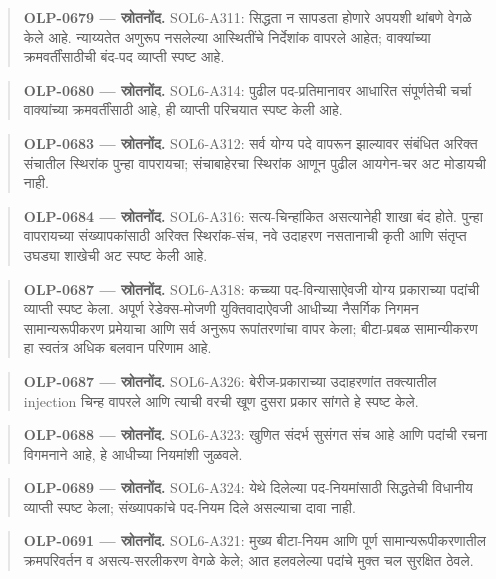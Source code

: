 \begin{quote}\small\textbf{OLP-0679 — स्रोतनोंद.} SOL6-A311: सिद्धता न सापडता होणारे अपयशी थांबणे वेगळे केले आहे. न्याय्यतेत अणुरूप नसलेल्या आस्थितींचे निर्देशांक वापरले आहेत; वाक्यांच्या क्रमवर्तींसाठीची बंद-पद व्याप्ती स्पष्ट आहे.\end{quote}
\begin{quote}\small\textbf{OLP-0680 — स्रोतनोंद.} SOL6-A314: पुढील पद-प्रतिमानावर आधारित संपूर्णतेची चर्चा वाक्यांच्या क्रमवर्तींसाठी आहे, ही व्याप्ती परिचयात स्पष्ट केली आहे.\end{quote}
\begin{quote}\small\textbf{OLP-0683 — स्रोतनोंद.} SOL6-A312: सर्व योग्य पदे वापरून झाल्यावर संबंधित अरिक्त संचातील स्थिरांक पुन्हा वापरायचा; संचाबाहेरचा स्थिरांक आणून पुढील आयगेन-चर अट मोडायची नाही.\end{quote}
\begin{quote}\small\textbf{OLP-0684 — स्रोतनोंद.} SOL6-A316: सत्य-चिन्हांकित असत्यानेही शाखा बंद होते. पुन्हा वापरायच्या संख्यापकांसाठी अरिक्त स्थिरांक-संच, नवे उदाहरण नसतानाची कृती आणि संतृप्त उघड्या शाखेची अट स्पष्ट केली आहे.\end{quote}
\begin{quote}\small\textbf{OLP-0687 — स्रोतनोंद.} SOL6-A318: कच्च्या पद-विन्यासाऐवजी योग्य प्रकाराच्या पदांची व्याप्ती स्पष्ट केला. अपूर्ण रेडेक्स-मोजणी युक्तिवादाऐवजी आधीच्या नैसर्गिक निगमन सामान्यरूपीकरण प्रमेयाचा आणि सर्व अनुरूप रूपांतरणांचा वापर केला; बीटा-प्रबळ सामान्यीकरण हा स्वतंत्र अधिक बलवान परिणाम आहे.\end{quote}
\begin{quote}\small\textbf{OLP-0687 — स्रोतनोंद.} SOL6-A326: बेरीज-प्रकाराच्या उदाहरणांत तक्त्यातील injection चिन्ह वापरले आणि त्याची वरची खूण दुसरा प्रकार सांगते हे स्पष्ट केले.\end{quote}
\begin{quote}\small\textbf{OLP-0688 — स्रोतनोंद.} SOL6-A323: खुणित संदर्भ सुसंगत संच आहे आणि पदांची रचना विगमनाने आहे, हे आधीच्या नियमांशी जुळवले.\end{quote}
\begin{quote}\small\textbf{OLP-0689 — स्रोतनोंद.} SOL6-A324: येथे दिलेल्या पद-नियमांसाठी सिद्धतेची विधानीय व्याप्ती स्पष्ट केला; संख्यापकांचे पद-नियम दिले असल्याचा दावा नाही.\end{quote}
\begin{quote}\small\textbf{OLP-0691 — स्रोतनोंद.} SOL6-A321: मुख्य बीटा-नियम आणि पूर्ण सामान्यरूपीकरणातील क्रमपरिवर्तन व असत्य-सरलीकरण वेगळे केले; आत हलवलेल्या पदांचे मुक्त चल सुरक्षित ठेवले.\end{quote}
